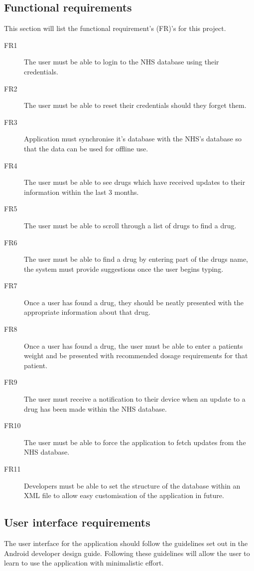 \documentclass[11pt,fleqn,twoside]{article}
\begin{document}
\subsection{Functional requirements}
This section will list the functional requirement's (FR)'s for this project.

\begin{description}
\item[FR1] The user must be able to login to the NHS database using their credentials.
\item[FR2] The user must be able to reset their credentials should they forget them.
\item[FR3] Application must synchronise it's database with the NHS's database so that the data can be used for offline use.
\item[FR4] The user must be able to see drugs which have received updates to their information within the last 3 months.
\item[FR5] The user must be able to scroll through a list of drugs to find a drug.
\item[FR6] The user must be able to find a drug by entering part of the drugs name, the system must provide suggestions once the user begins typing.
\item[FR7] Once a user has found a drug, they should be neatly presented with the appropriate information about that drug.
\item[FR8] Once a user has found a drug, the user must be able to enter a patients weight and be presented with recommended dosage requirements for that patient.
\item[FR9] The user must receive a notification to their device when an update to a drug has been made within the NHS database.
\item[FR10] The user must be able to force the application to fetch updates from the NHS database.
\item[FR11] Developers must be able to set the structure of the database within an XML file to allow easy customisation of the application in future.
\end{description}

\subsection{User interface requirements}
The user interface for the application should follow the guidelines set out in the Android developer design guide. Following these guidelines will allow the user to learn to use the application with minimalistic effort.
\end{document}
